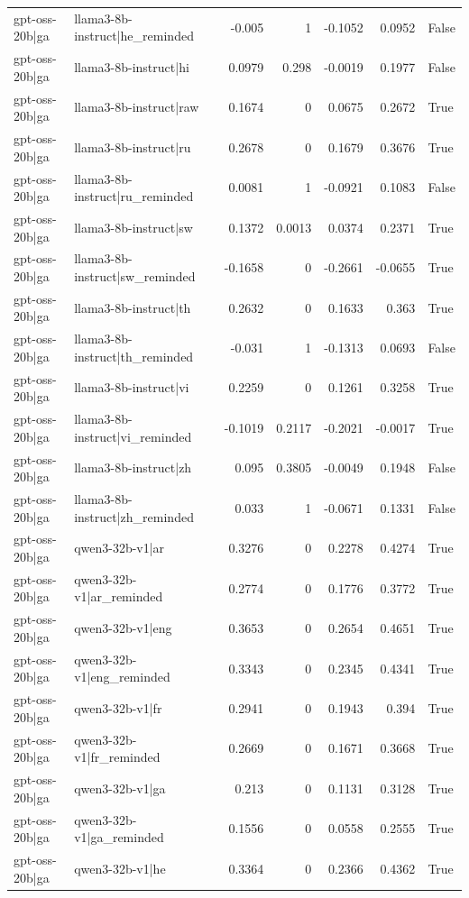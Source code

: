 \begin{table}
\begin{tabular}{l l r r r r l}
gpt-oss-20b|ga & llama3-8b-instruct|he_reminded & -0.005 & 1 & -0.1052 & 0.0952 & False \\
gpt-oss-20b|ga & llama3-8b-instruct|hi & 0.0979 & 0.298 & -0.0019 & 0.1977 & False \\
gpt-oss-20b|ga & llama3-8b-instruct|raw & 0.1674 & 0 & 0.0675 & 0.2672 & True \\
gpt-oss-20b|ga & llama3-8b-instruct|ru & 0.2678 & 0 & 0.1679 & 0.3676 & True \\
gpt-oss-20b|ga & llama3-8b-instruct|ru_reminded & 0.0081 & 1 & -0.0921 & 0.1083 & False \\
gpt-oss-20b|ga & llama3-8b-instruct|sw & 0.1372 & 0.0013 & 0.0374 & 0.2371 & True \\
gpt-oss-20b|ga & llama3-8b-instruct|sw_reminded & -0.1658 & 0 & -0.2661 & -0.0655 & True \\
gpt-oss-20b|ga & llama3-8b-instruct|th & 0.2632 & 0 & 0.1633 & 0.363 & True \\
gpt-oss-20b|ga & llama3-8b-instruct|th_reminded & -0.031 & 1 & -0.1313 & 0.0693 & False \\
gpt-oss-20b|ga & llama3-8b-instruct|vi & 0.2259 & 0 & 0.1261 & 0.3258 & True \\
gpt-oss-20b|ga & llama3-8b-instruct|vi_reminded & -0.1019 & 0.2117 & -0.2021 & -0.0017 & True \\
gpt-oss-20b|ga & llama3-8b-instruct|zh & 0.095 & 0.3805 & -0.0049 & 0.1948 & False \\
gpt-oss-20b|ga & llama3-8b-instruct|zh_reminded & 0.033 & 1 & -0.0671 & 0.1331 & False \\
gpt-oss-20b|ga & qwen3-32b-v1|ar & 0.3276 & 0 & 0.2278 & 0.4274 & True \\
gpt-oss-20b|ga & qwen3-32b-v1|ar_reminded & 0.2774 & 0 & 0.1776 & 0.3772 & True \\
gpt-oss-20b|ga & qwen3-32b-v1|eng & 0.3653 & 0 & 0.2654 & 0.4651 & True \\
gpt-oss-20b|ga & qwen3-32b-v1|eng_reminded & 0.3343 & 0 & 0.2345 & 0.4341 & True \\
gpt-oss-20b|ga & qwen3-32b-v1|fr & 0.2941 & 0 & 0.1943 & 0.394 & True \\
gpt-oss-20b|ga & qwen3-32b-v1|fr_reminded & 0.2669 & 0 & 0.1671 & 0.3668 & True \\
gpt-oss-20b|ga & qwen3-32b-v1|ga & 0.213 & 0 & 0.1131 & 0.3128 & True \\
gpt-oss-20b|ga & qwen3-32b-v1|ga_reminded & 0.1556 & 0 & 0.0558 & 0.2555 & True \\
gpt-oss-20b|ga & qwen3-32b-v1|he & 0.3364 & 0 & 0.2366 & 0.4362 & True \\

\end{tabular}
\end{table}
